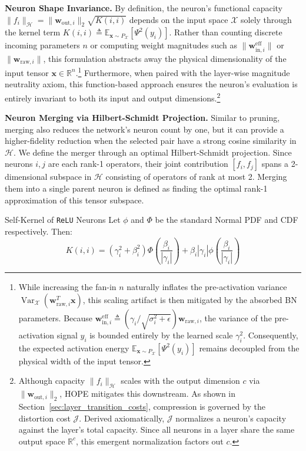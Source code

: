 \documentclass[11pt, a4paper, copyright, gdm]{google}
\newcommand{\wVect}{\boldsymbol{w}}
\newcommand{\xVect}{\boldsymbol{x}}
\newcommand{\calH}{\mathcal{H}}
\newcommand{\calJ}{\mathcal{J}}
\newcommand{\calX}{\mathcal{X}}
\newcommand{\R}{\mathbb{R}}
\newcommand{\E}{\mathbb{E}}
\newcommand{\normPDF}{\phi}
\newcommand{\normCDF}{\Phi}
\newcommand{\ReLU}{\texttt{ReLU}\xspace}
\DeclareMathOperator{\Var}{Var}
\theoremstyle{definition}
\begin{document}
\noindent \textbf{Neuron Shape Invariance.} 
By definition, the neuron's functional capacity $\|f_i\|_{\calH} = \|\wVect_{\text{out},i}\|_2 \sqrt{K(i, i)}$ depends on the input space $\calX$ solely through the kernel term $K(i,i) \triangleq \E_{\xVect \sim P_{\calX}} [ \Psi^2(y_i) ]$. Rather than counting discrete incoming parameters $n$ or computing weight magnitudes such as $\|\wVect_{\text{in},i}^\text{eff}\|$ or $\|\wVect_{\text{raw},i}\|$, this formulation abstracts away the physical dimensionality of the input tensor $\xVect \in \R^n$.\footnote{While increasing the fan-in $n$ naturally inflates the pre-activation variance $\Var_{\calX}(\wVect_{\text{raw},i}^T \xVect)$, this scaling artifact is then mitigated by the absorbed BN parameters. Because  $\wVect_{\text{in},i}^{\text{eff}} \triangleq (\gamma_i/\sqrt{\sigma_i^2 + \epsilon}) \wVect_{\text{raw},i}$, the variance of the pre-activation signal $y_i$ is bounded entirely by the learned scale $\gamma_i^2$. Consequently, the expected activation energy $\E_{\xVect \sim P_{\calX}} [ \Psi^2(y_i) ]$ remains decoupled from the physical width of the input tensor.} Furthermore, when paired with the layer-wise magnitude neutrality axiom, this function-based approach ensures the neuron's evaluation is entirely invariant to both its input and output dimensions.\footnote{Although capacity $\|f_i\|_\calH$ scales with the output dimension $c$ via $\|\wVect_{\text{out},i}\|_2$, HOPE mitigates this downstream. As shown in Section~\ref{sec:layer_transition_costs}, compression is governed by the distortion cost $\calJ$. Derived axiomatically, $\calJ$ normalizes a neuron's capacity against the layer's total capacity. Since all neurons in a layer share the same output space $\R^c$, this emergent normalization factors out $c$.}

\noindent \textbf{Neuron Merging via Hilbert-Schmidt Projection.} Similar to pruning, merging also reduces the network's neuron count by one, but it can provide a higher-fidelity reduction when the selected pair have a strong cosine similarity in $\calH$. We define the merger through an optimal Hilbert-Schmidt projection. Since neurons $i,j$ are each rank-1 operators, their joint contribution $[f_i, f_j]$ spans a 2-dimensional subspace in $\calH$ consisting of operators of rank at most 2. Merging them into a single parent neuron is defined as finding the optimal rank-1 approximation of this tensor subspace.

\begin{insight}{Self-Kernel of \ReLU Neurons}
Let $\normPDF$ and $\normCDF$ be the standard Normal PDF and CDF respectively. Then:
\begin{equation}
    K(i, i) = (\gamma_i^2 + \beta_i^2)\normCDF\left(\frac{\beta_i}{|\gamma_i|}\right) + \beta_i|\gamma_i|\normPDF\left(\frac{\beta_i}{|\gamma_i|}\right)
\end{equation}
\end{insight}
\end{document}
